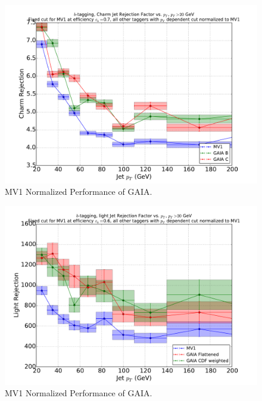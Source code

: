 \begin{figure}
\includegraphics[width=\textwidth]{figures/btag/c_rej_mv1normalized_pTdep_70pct.pdf}
\caption[The ATLAS detector]{MV1 Normalized Performance of GAIA.
\label{fig:crejmv1norm60}}
\end{figure}


\begin{figure}
\includegraphics[width=\textwidth]{figures/btag/u_rej_mv1normalized_pTdep_60pct.pdf}
\caption[The ATLAS detector]{MV1 Normalized Performance of GAIA.
\label{fig:urejmv1norm60}}
\end{figure}

